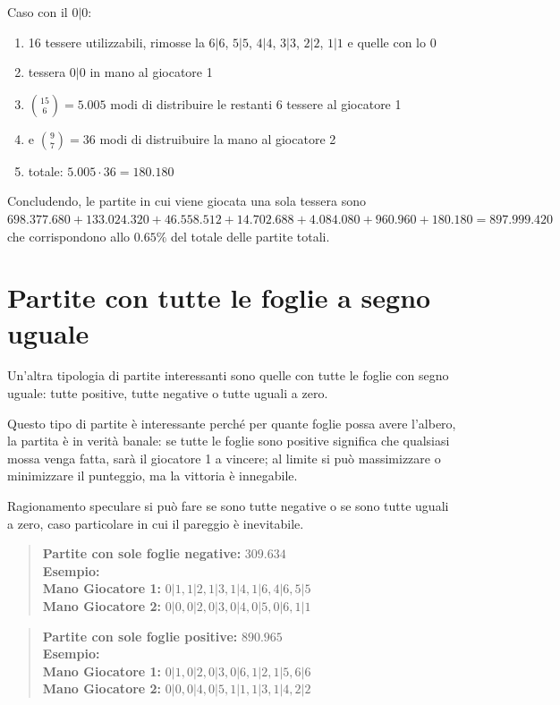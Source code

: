 \documentclass[a4paper,12pt]{report}
\begin{document}
Caso con il \(0|0\):
\begin{enumerate}
    \item 16 tessere utilizzabili, rimosse la \(6|6\), \(5|5\), \(4|4\), \(3|3\), \(2|2\), \(1|1\) e quelle con lo 0
    \item tessera \(0|0\) in mano al giocatore 1
    \item \(\binom{15}{6} = 5.005\) modi di distribuire le restanti 6 tessere al giocatore 1
    \item e \(\binom{9}{7} = 36\) modi di distruibuire la mano al giocatore 2
    \item totale: \( 5.005 \cdot 36 = 180.180 \)
\end{enumerate}

Concludendo, le partite in cui viene giocata una sola tessera sono \( 698.377.680 + 133.024.320 + 46.558.512 + 14.702.688 + 4.084.080 + 960.960 + 180.180 = 897.999.420\) che corrispondono allo \( 0.65\%\) del totale delle partite totali.

\section{Partite con tutte le foglie a segno uguale}

Un'altra tipologia di partite interessanti sono quelle con tutte le foglie con segno uguale: tutte positive, tutte negative o tutte uguali a zero.

Questo tipo di partite è interessante perché per quante foglie possa avere l'albero, la partita è in verità banale: se tutte le foglie sono positive significa che qualsiasi mossa venga fatta, sarà il giocatore 1 a vincere; al limite si può massimizzare o minimizzare il punteggio, ma la vittoria è innegabile.

Ragionamento speculare si può fare se sono tutte negative o se sono tutte uguali a zero, caso particolare in cui il pareggio è inevitabile.


\begin{quote}
    \textbf{Partite con sole foglie negative:} \(309.634\)\\
    \textbf{Esempio:} \(\)\\
    \textbf{Mano Giocatore 1:} \(0|1, 1|2, 1|3, 1|4, 1|6, 4|6, 5|5\)\\
    \textbf{Mano Giocatore 2:} \(0|0, 0|2, 0|3, 0|4, 0|5, 0|6, 1|1\)
\end{quote}


\begin{quote}
    \textbf{Partite con sole foglie positive:} \(890.965\)\\
    \textbf{Esempio:} \(\)\\
    \textbf{Mano Giocatore 1:} \(0|1, 0|2, 0|3, 0|6, 1|2, 1|5, 6|6\)\\
    \textbf{Mano Giocatore 2:} \(0|0, 0|4, 0|5, 1|1, 1|3, 1|4, 2|2\)
\end{quote}
\end{document}
